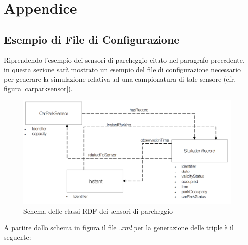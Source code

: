 \documentclass[12pt,a4paper,italian]{article}
\begin{document}
\section{Appendice}
\subsection{Esempio di File di Configurazione}
Riprendendo l'esempio dei sensori di parcheggio citato nel paragrafo precedente, in questa sezione sarà mostrato un esempio del file di configurazione necessario per generare la simulazione relativa ad una campionatura di tale sensore (cfr. figura \ref{carparksensor}).

\begin{figure}[h!]
	\centering
	\includegraphics[width=14cm]{img/CPSschema.png}
	\caption{Schema delle classi RDF  dei sensori di parcheggio}\label{carparksensorschema}
\end{figure}
A partire dallo schema in figura il file \emph{.xml} per la generazione delle triple è il seguente:\\
\end{document}

